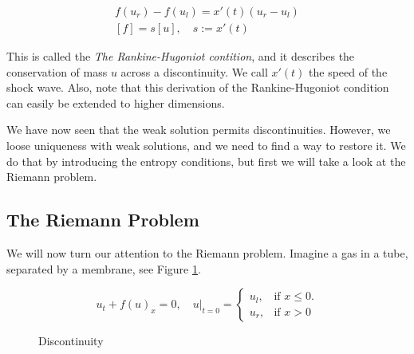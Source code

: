 \documentclass{article}
\numberwithin{equation}{section}
\begin{document}
\begin{align}
    f(u_r) - f(u_l)  = x'(t)(u_r - u_l) \\
    [f] = s[u], \quad s := x'(t) 
\end{align}


This is called the \textit{The Rankine-Hugoniot contition}, and it describes the conservation of mass $u$ across a discontinuity. We call $x'(t)$ the speed of the shock wave. Also, note that this derivation of the Rankine-Hugoniot condition can easily be extended to higher dimensions.

We have now seen that the weak solution permits discontinuities. However, we loose uniqueness with weak solutions, and we need to find a way to restore it. We do that by introducing the entropy conditions, but first we will take a look at the Riemann problem.
 
\subsection{The Riemann Problem}
We will now turn our attention to the Riemann problem. Imagine a gas in a tube, separated by a membrane, see Figure \ref{Fig:riemann_tube}. 

\begin{equation}
 u_t + f(u)_x = 0,  \quad u|_{t = 0 } = \begin{cases} u_l, & \text{if $x \leq 0$}.\\ u_r, & \text{if $x>0$} 
 \end{cases}
\end{equation}


	 
\begin{figure}
    \begin{center}
    \caption{Discontinuity}
    \label{Fig:riemann_tube}
    \end{center}
\end{figure}{}	 
	 
\end{document}
